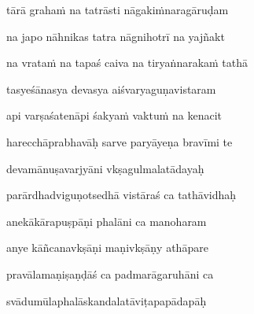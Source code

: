 tārā graha\.m na tatrāsti nāgaki\.mnaragāruḍam \veg\dontdisplaylinenum

na japo nāhnikas tatra nāgnihotrī na yajñakt\thinspace{\dandab} \dontdisplaylinenum

na vrata\.m na tapaś caiva na tiryaṅnaraka\.m tathā \veg\dontdisplaylinenum

tasyeśānasya devasya aiśvaryaguṇavistaram\thinspace{\dandab} \dontdisplaylinenum

api varṣaśatenāpi śakya\.m vaktu\.m na kenacit \veg\dontdisplaylinenum

harecchāprabhavāḥ sarve paryāyeṇa bravīmi te\thinspace{\dandab} \dontdisplaylinenum

devamānuṣavarjyāni vkṣagulmalatādayaḥ \veg\dontdisplaylinenum

parārdhadviguṇotsedhā vistāraś ca tathāvidhaḥ\thinspace{\dandab} \dontdisplaylinenum

anekākārapuṣpāṇi phalāni ca manoharam \veg\dontdisplaylinenum

anye kāñcanavkṣāṇi maṇivkṣāṇy athāpare\thinspace{\dandab} \dontdisplaylinenum

pravālamaṇiṣaṇḍāś ca padmarāgaruhāni ca \veg\dontdisplaylinenum

svādumūlaphalāskandalatāviṭapapādapāḥ\thinspace{\dandab} \dontdisplaylinenum

